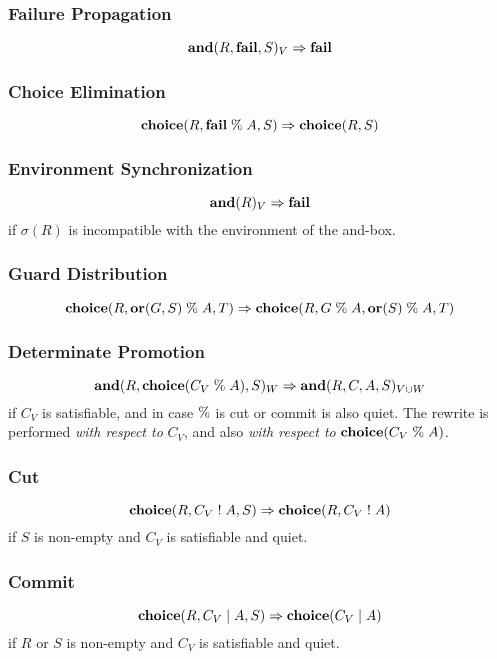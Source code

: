 \subsubsection*{Failure Propagation}

$$\mbox{\bf and}(R,\mbox{\bf fail},S)_V \Rightarrow \mbox{\bf fail}$$

\subsubsection*{Choice Elimination}

$$\mbox{\bf choice}(R,\mbox{\bf fail}\mathrel{\mbox{\%}} A,S) \Rightarrow \mbox{\bf choice}(R,S)$$

\subsubsection*{Environment Synchronization}

$$\mbox{\bf and}(R)_V \Rightarrow \mbox{\bf fail}$$ 
%
if $\sigma(R)$ is incompatible with the environment of the and-box.

\subsubsection*{Guard Distribution}

$$\mbox{\bf choice}(R,\mbox{\bf or}(G,S) \mathrel{\mbox{\%}} A,T) \Rightarrow \mbox{\bf choice}(R,G \mathrel{\mbox{\%}} A,\mbox{\bf or}(S) \mathrel{\mbox{\%}} A,T)$$

\subsubsection*{Determinate Promotion}

$$\mbox{\bf and}(R,\mbox{\bf choice}(C_V \mathrel{\mbox{\%}} A),S)_W \Rightarrow \mbox{\bf and}(R,C,A,S)_{V \cup W}$$
%
if $C_V$ is satisfiable, and in case $\mathrel{\mbox{\%}}$ is cut or commit is also
quiet.  The rewrite is performed {\em with respect to} $C_V$, and also
{\em with respect to} $\mbox{\bf choice}(C_V \mathrel{\mbox{\%}} A)$.

\subsubsection*{Cut}

$$\mbox{\bf choice}(R,C_V \mathrel{\mbox{!}} A,S) \Rightarrow \mbox{\bf choice}(R,C_V \mathrel{\mbox{!}} A)$$
%
if $S$ is non-empty and $C_V$ is satisfiable and quiet.

\subsubsection*{Commit}

$$\mbox{\bf choice}(R,C_V \mid A,S) \Rightarrow \mbox{\bf choice}(C_V \mid A)$$
%
if $R$ or $S$ is non-empty and $C_V$ is satisfiable and quiet.

